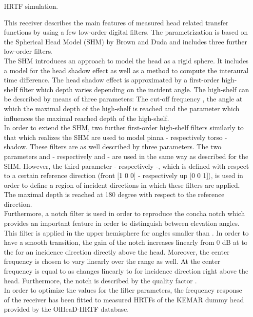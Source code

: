 HRTF simulation.

This receiver describes the main features of measured head related transfer functions by using a few low-order digital filters. The parametrization is based on the Spherical Head Model (SHM) by Brown and Duda and includes three further low-order filters. \\
The SHM introduces an approach to model the head as a rigid sphere. It includes a model for the head shadow effect as well as a method to compute the interaural time difference. The head shadow effect is approximated by a first-order high-shelf filter which depth varies depending on the incident angle. The high-shelf can be described by means of three parameters: The cut-off frequency , the angle  at which the maximal depth of the high-shelf is reached and the parameter  which influences the maximal reached depth of the high-shelf. \\
In order to extend the SHM, two further first-order high-shelf filters similarly to that which realizes the SHM are used to model pinna - respectively torso - shadow. These filters are as well described by three parameters. The two parameters  and  - respectively  and  - are used in the same way as described for the SHM. 
However, the third parameter  - respectively  -, which is defined with respect to a certain reference direction (front [1 0 0] - respectively up [0 0 1]), is used in order to define a region of incident directions in which these filters are applied. The maximal depth is reached at 180 degree with respect to the reference direction. \\
Furthermore, a notch filter is used in order to reproduce the concha notch which provides an important feature in order to distinguish between elevation angles. This filter is applied in the upper hemisphere for angles smaller than . In order to have a smooth transition, the gain of the notch increases linearly from 0 dB at  to the  for an incidence direction directly above the head. Moreover, the center frequency is chosen to vary linearly over the range as well. At  the center frequency is equal to  as changes linearly to  for incidence direction right above the head. Furthermore, the notch is described by the quality factor .\\
In order to optimize the values for the filter parameters, the frequency response of the receiver has been fitted to measured HRTFs of the KEMAR dummy head provided by the OlHeaD-HRTF database.

